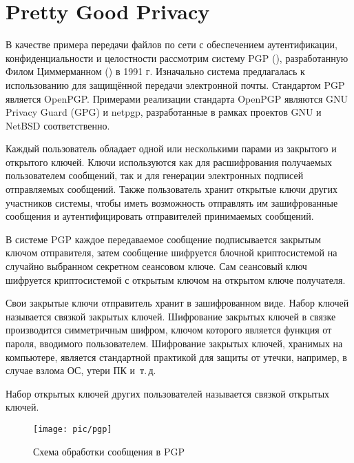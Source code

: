 \section{Pretty Good Privacy}

В качестве примера передачи файлов по сети с обеспечением аутентификации, конфиденциальности и целостности рассмотрим систему PGP (), разработанную Филом Циммерманном () в 1991 г. Изначально система предлагалась к использованию для защищённой передачи электронной почты. Стандартом PGP является OpenPGP. Примерами реализации стандарта OpenPGP являются GNU Privacy Guard (GPG) и netpgp, разработанные в рамках проектов GNU и NetBSD соответственно.

Каждый пользователь обладает одной или несколькими парами из закрытого и открытого ключей. Ключи используются как для расшифрования получаемых пользователем сообщений, так и для генерации электронных подписей отправляемых сообщений. Также пользователь хранит открытые ключи других участников системы, чтобы иметь возможность отправлять им зашифрованные сообщения и аутентифицировать отправителей принимаемых сообщений.

В системе PGP каждое передаваемое сообщение подписывается закрытым ключом отправителя, затем сообщение шифруется блочной криптосистемой на случайно выбранном секретном сеансовом ключе. Сам сеансовый ключ шифруется криптосистемой с открытым ключом на открытом ключе получателя.

Свои закрытые ключи отправитель хранит в зашифрованном виде. Набор ключей называется связкой закрытых ключей. Шифрование закрытых ключей в связке производится симметричным шифром, ключом которого является функция от пароля, вводимого пользователем. Шифрование закрытых ключей, хранимых на компьютере, является стандартной практикой для защиты от утечки, например, в случае взлома ОС, утери ПК и~т.\,д.

Набор открытых ключей других пользователей называется связкой открытых ключей.

\begin{figure}[!ht]
	\centering
	\texttt{[image: pic/pgp]}
	\caption{Схема обработки сообщения в PGP\label{fig:pgp}}
\end{figure}

